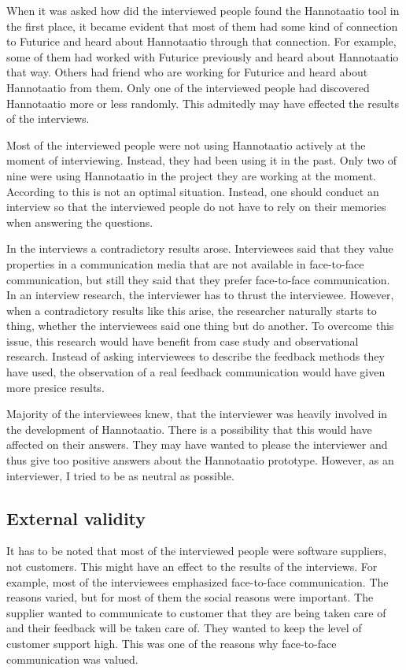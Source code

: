 \documentclass[english,12pt,a4paper,pdftex]{article}
\begin{document}
When it was asked how did the interviewed people found the Hannotaatio tool in the first place, it became evident that most of them had some kind of connection to Futurice and heard about Hannotaatio through that connection. For example, some of them had worked with Futurice previously and heard about Hannotaatio that way. Others had friend who are working for Futurice and heard about Hannotaatio from them. Only one of the interviewed people had discovered Hannotaatio more or less randomly. This admitedly may have effected the results of the interviews. 

Most of the interviewed people were not using Hannotaatio actively at the moment of interviewing. Instead, they had been using it in the past. Only two of nine were using Hannotaatio in the project they are working at the moment. According to \citet{silverman2009} this is not an optimal situation. Instead, one should conduct an interview so that the interviewed people do not have to rely on their memories when answering the questions.

In the interviews a contradictory results arose. Interviewees said that they value properties in a communication media that are not available in face-to-face communication, but still they said that they prefer face-to-face communication. In an interview research, the interviewer has to thrust the interviewee. However, when a contradictory results like this arise, the researcher naturally starts to thing, whether the interviewees said one thing but do another. To overcome this issue, this research would have benefit from case study and observational research. Instead of asking interviewees to describe the feedback methods they have used, the observation of a real feedback communication would have given more presice results.

Majority of the interviewees knew, that the interviewer was heavily involved in the development of Hannotaatio. There is a possibility that this would have affected on their answers. They may have wanted to please the interviewer and thus give too positive answers about the Hannotaatio prototype. However, as an interviewer, I tried to be as neutral as possible.

\subsection{External validity}

It has to be noted that most of the interviewed people were software suppliers, not customers. This might have an effect to the results of the interviews. For example, most of the interviewees emphasized face-to-face communication. The reasons varied, but for most of them the social reasons were important. The supplier wanted to communicate to customer that they are being taken care of and their feedback will be taken care of. They wanted to keep the level of customer support high. This was one of the reasons why face-to-face communication was valued. 
\end{document}
